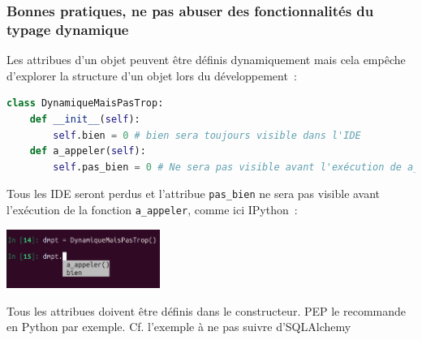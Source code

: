 \documentclass{beamer}
\begin{document}
    \begin{frame}[fragile]
        \transdissolve
        \frametitle{Bonnes pratiques, ne pas abuser des fonctionnalités du typage dynamique}
        \pause
        Les attribues d'un objet peuvent être définis dynamiquement mais cela empêche d'explorer la structure d'un objet lors du développement~:
        \begin{lstlisting}[language=python]
class DynamiqueMaisPasTrop:
    def __init__(self):
        self.bien = 0 # bien sera toujours visible dans l'IDE
    def a_appeler(self):
        self.pas_bien = 0 # Ne sera pas visible avant l'exécution de a_appeler
        \end{lstlisting}

        Tous les IDE seront perdus et l'attribue \lstinline{pas_bien} ne sera pas visible avant l'exécution de la fonction \lstinline{a_appeler}, comme ici IPython~:

        \centering
        \includegraphics[width=5cm]{image/dynamic-trick.png}

        \begin{flushleft}
            Tous les attribues doivent être définis dans le constructeur.
            PEP le recommande en Python par exemple.
            Cf. l'exemple à ne pas suivre d'SQLAlchemy
        \end{flushleft}

    \end{frame}
\end{document}
